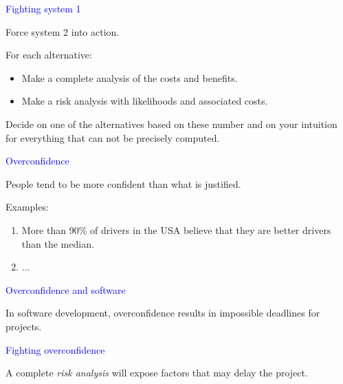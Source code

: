 \documentclass{slides}
\newcommand{\ti}[1]{\begin{center}\Large{\textcolor{blue}{#1}}\end{center}}
\begin{document}
\begin{slide}\ti{Fighting system 1}

Force system 2 into action.

For each alternative:

\begin{itemize}
\item Make a complete analysis of the costs and benefits.
\item Make a risk analysis with likelihoods and associated costs.
\end{itemize}

Decide on one of the alternatives based on these number and on your
intuition for everything that can not be precisely computed.

\vfill\end{slide}
\begin{slide}\ti{Overconfidence}

People tend to be more confident than what is justified.

Examples:

\begin{enumerate}
\item More than 90\% of drivers in the USA believe that they are
  better drivers than the median.
\item ...
\end{enumerate}

\vfill\end{slide}
\begin{slide}\ti{Overconfidence and software}

In software development, overconfidence results in impossible
deadlines for projects.

\vfill\end{slide}
\begin{slide}\ti{Fighting overconfidence}

A complete \emph{risk analysis} will expose factors that may delay the
project.

\vfill\end{slide}
\end{document}
